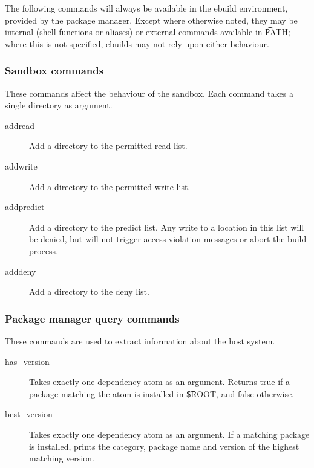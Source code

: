 \label{pkg-mgr-commands}

The following commands will always be available in the ebuild environment, provided by the package
manager. Except where otherwise noted, they may be internal (shell functions or aliases) or external
commands available in \t{PATH}; where this is not specified, ebuilds may not rely upon either
behaviour.

\subsubsection{Sandbox commands}
These commands affect the behaviour of the sandbox. Each command takes a single directory as
argument.
\begin{description}
\item[addread] Add a directory to the permitted read list.
\item[addwrite] Add a directory to the permitted write list.
\item[addpredict] Add a directory to the predict list. Any write to a location in this list will be
    denied, but will not trigger access violation messages or abort the build process.
\item[adddeny] Add a directory to the deny list.
\end{description}

\subsubsection{Package manager query commands}
These commands are used to extract information about the host system.
\begin{description}
\item[has\_version] Takes exactly one dependency atom as an argument. Returns true if a package
    matching the atom is installed in \t{\$ROOT}, and false otherwise.
\item[best\_version] Takes exactly one dependency atom as an argument. If a matching package is
    installed, prints the category, package name and version of the highest matching version.
\end{description}

